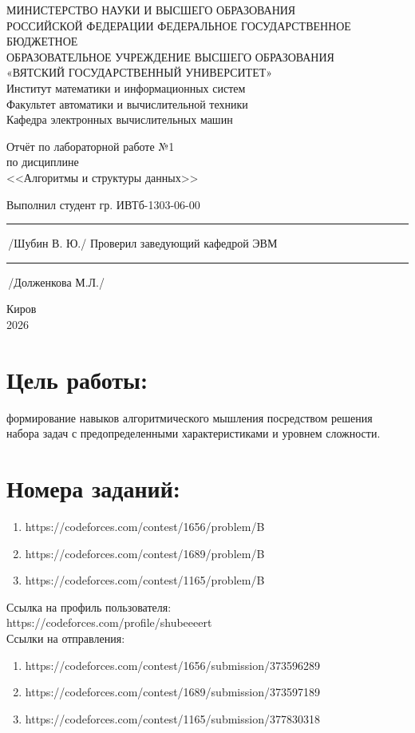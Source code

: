 \documentclass[oneside,a4paper,14pt]{extarticle} %
\begin{document}
	\newpage\thispagestyle{empty}
	\begin{center}
		МИНИСТЕРСТВО НАУКИ И ВЫСШЕГО ОБРАЗОВАНИЯ\\
		РОССИЙСКОЙ ФЕДЕРАЦИИ
		ФЕДЕРАЛЬНОЕ ГОСУДАРСТВЕННОЕ БЮДЖЕТНОЕ\\
		ОБРАЗОВАТЕЛЬНОЕ
		УЧРЕЖДЕНИЕ ВЫСШЕГО ОБРАЗОВАНИЯ\\
		«ВЯТСКИЙ ГОСУДАРСТВЕННЫЙ УНИВЕРСИТЕТ»\\
		Институт математики и информационных систем\\
		Факультет автоматики и вычислительной техники\\
		Кафедра электронных вычислительных машин
	\end{center}
	\vspace{20mm}
	
	\begin{center}
		Отчёт по лабораторной работе №1\\
		по дисциплине\\
		<<Алгоритмы и структуры данных>>\\
	\end{center}
	\vspace{48mm}
	
	\noindent
	Выполнил студент гр. ИВТб-1303-06-00 \hfill \rule[-0,5mm]{30mm}{0.15mm}\,/Шубин В. Ю./
	\newline
	Проверил заведующий кафедрой ЭВМ \hfill \rule[-0,5mm]{30mm}{0.15mm}\,/Долженкова М.Л./
	
	\vfill
	\begin{center}
		Киров\\
		2026
	\end{center}
	
	\newpage
	\thispagestyle{empty}
	
	\section*{Цель работы:} формирование навыков алгоритмического мышления посредством решения набора задач с предопределенными характеристиками и уровнем сложности.
	\section*{Номера заданий:}
	\begin{enumerate}
		\item https://codeforces.com/contest/1656/problem/B
		\item https://codeforces.com/contest/1689/problem/B
		\item https://codeforces.com/contest/1165/problem/B
	\end{enumerate}
	\noindent Ссылка на профиль пользователя:\\
	\indent https://codeforces.com/profile/shubeeeert \\
	\noindent Ссылки на отправления:
	\begin{enumerate}
		\item https://codeforces.com/contest/1656/submission/373596289
		\item https://codeforces.com/contest/1689/submission/373597189
		\item https://codeforces.com/contest/1165/submission/377830318
	\end{enumerate}
	\newpage
\end{document}
